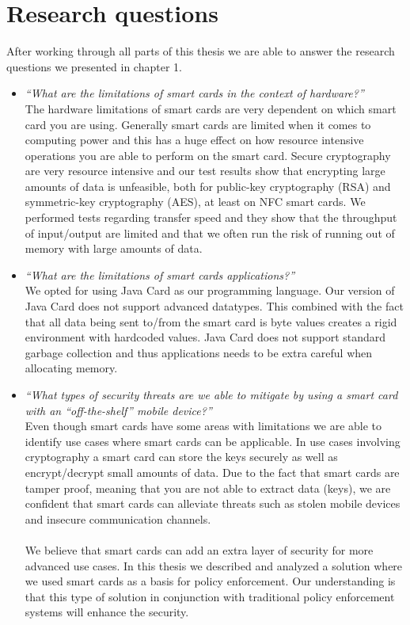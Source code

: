 \section{Research questions}
After working through all parts of this thesis we are able to answer the research questions we presented in chapter 1.
\begin{itemize}
  \item \textit{``What are the limitations of smart cards in the context of hardware?''}\\
  The hardware limitations of smart cards are very dependent on which smart card you are using. Generally smart cards are limited when it comes to computing power and this has a huge effect on how resource intensive operations you are able to perform on the smart card. Secure cryptography are very resource intensive and our test results show that encrypting large amounts of data is unfeasible, both for public-key cryptography (RSA) and symmetric-key cryptography (AES), at least on NFC smart cards. We performed tests regarding transfer speed and they show that the throughput of input/output are limited and that we often run the risk of running out of memory with large amounts of data.
  \item \textit{``What are the limitations of smart cards applications?''}\\
  We opted for using Java Card as our programming language. Our version of Java Card does not support advanced datatypes. This combined with the fact that all data being sent to/from the smart card is byte values creates a rigid environment with hardcoded values. Java Card does not support standard garbage collection and thus applications needs to be extra careful when allocating memory.
  \item \textit{``What types of security threats are we able to mitigate by using a smart card with an ``off-the-shelf'' mobile device?''}\\
  Even though smart cards have some areas with limitations we are able to identify use cases where smart cards can be applicable. In use cases involving cryptography a smart card can store the keys securely as well as encrypt/decrypt small amounts of data. Due to the fact that smart cards are tamper proof, meaning that you are not able to extract data (keys), we are confident that smart cards can alleviate threats such as stolen mobile devices and insecure communication channels.\mbox{}\\\\  We believe that smart cards can add an extra layer of security for more advanced use cases. In this thesis we described and analyzed a solution where we used smart cards as a basis for policy enforcement. Our understanding is that this type of solution in conjunction with traditional policy enforcement systems will enhance the security.
\end{itemize}

